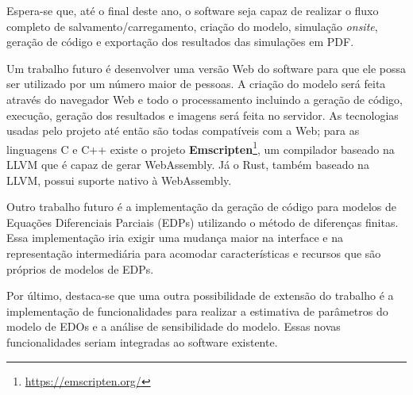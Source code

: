\documentclass[
	12pt,				%
	openright,			%
	oneside,			%
	a4paper,			%
	main=brazil,
	english,			%
	]{ufsj-abntex2}
\begin{document}
Espera-se que, até o final deste ano, o software seja capaz de realizar o fluxo completo de salvamento/carregamento, criação do modelo, simulação \textit{onsite}, geração de código e exportação dos resultados das simulações em PDF.

Um trabalho futuro é desenvolver uma versão Web do software para que ele possa ser utilizado por um número maior de pessoas. A criação do modelo será feita através do navegador Web e todo o processamento incluindo a geração de código, execução, geração dos resultados e imagens será feita no servidor. As tecnologias usadas pelo projeto até então são todas compatíveis com a Web; para as linguagens C e C++ existe o projeto \textbf{Emscripten}\footnote{\href{https://emscripten.org/}{https://emscripten.org/}}, um compilador baseado na LLVM que é capaz de gerar WebAssembly. Já o Rust, também baseado na LLVM, possui suporte nativo à WebAssembly.

Outro trabalho futuro é a implementação da geração de código para modelos de Equações Diferenciais Parciais (EDPs) utilizando o método de diferenças finitas. Essa implementação iria exigir uma mudança maior na interface e na representação intermediária para acomodar características e recursos que são próprios de modelos de EDPs. 

Por último, destaca-se que uma outra possibilidade de extensão do trabalho é a implementação de funcionalidades para realizar a estimativa de parâmetros do modelo de EDOs e a análise de sensibilidade do modelo. Essas novas funcionalidades seriam integradas ao software existente.  




\postextual
\end{document}
